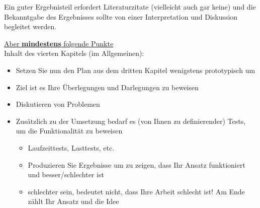 Ein guter Ergebnisteil erfordert Literaturzitate (vielleicht auch gar keine) und die Bekanntgabe des Ergebnisses sollte von einer Interpretation und Diskussion begleitet werden. 


\newpage

\underline{Aber \textbf{mindestens} folgende Punkte}\\
Inhalt des vierten Kapitels (im Allgemeinen):
\begin{itemize}
    \item Setzen Sie nun den Plan aus dem dritten Kapitel wenigstens prototypisch um
    \item Ziel ist es Ihre Überlegungen und Darlegungen zu beweisen
    \item Diskutieren von Problemen
    \item Zusätzlich zu der Umsetzung bedarf es (von Ihnen zu definierender) Tests, um die Funktionalität zu beweisen
    \begin{itemize}
        \item Laufzeittests, Lasttests, etc.
        \item Produzieren Sie Ergebnisse um zu zeigen, dass Ihr Ansatz funktioniert und besser/schlechter ist
        \item \glqq schlechter\grqq{} sein, bedeutet nicht, dass Ihre Arbeit schlecht ist! Am Ende zählt Ihr Ansatz und die Idee
    \end{itemize}
\end{itemize}
